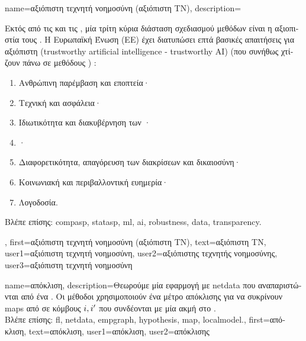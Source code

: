 {name={\foreignlanguage{greek}{αξιόπιστη τεχνητή νοημοσύνη (αξιόπιστη ΤΝ)}},
	description={\foreignlanguage{greek}{Εκτός από τις}  \foreignlanguage{greek}{και τις} , 
		\foreignlanguage{greek}{μία τρίτη κύρια διάσταση σχεδιασμού μεθόδων}  
		 \foreignlanguage{greek}{είναι η αξιοπιστία τους} 
		\cite{pfau2024engineeringtrustworthyaideveloper}. 
		\foreignlanguage{greek}{Η Ευρωπαϊκή Ένωση (ΕΕ) έχει διατυπώσει επτά βασικές απαιτήσεις για αξιόπιστη}  
		 (trustworthy artificial intelligence - trustworthy AI) \foreignlanguage{greek}{(που συνήθως χτίζουν πάνω σε 
		μεθόδους} ) \cite{ALTAIEU}: 
		\begin{enumerate}[label=\arabic*)]
			\item \foreignlanguage{greek}{Ανθρώπινη παρέμβαση και εποπτεία·}
			\item \foreignlanguage{greek}{Τεχνική}  \foreignlanguage{greek}{και ασφάλεια·}
			\item \foreignlanguage{greek}{Ιδιωτικότητα και διακυβέρνηση των} ·
			\item {}·
			\item \foreignlanguage{greek}{Διαφορετικότητα, απαγόρευση των διακρίσεων και δικαιοσύνη·}
			\item \foreignlanguage{greek}{Κοινωνιακή και περιβαλλοντική ευημερία·}
			\item \foreignlanguage{greek}{Λογοδοσία.}
		\end{enumerate}
		\foreignlanguage{greek}{Βλέπε επίσης:} \gls{compasp}, \gls{statasp}, \gls{ml}, \gls{ai}, \gls{robustness}, \gls{data}, \gls{transparency}.},
	first={\foreignlanguage{greek}{αξιόπιστη τεχνητή νοημοσύνη (αξιόπιστη ΤΝ)}},
	text={\foreignlanguage{greek}{αξιόπιστη ΤΝ}},
	user1={\foreignlanguage{greek}{αξιόπιστη τεχνητή νοημοσύνη}}, %
  	user2={\foreignlanguage{greek}{αξιόπιστης τεχνητής νοημοσύνης}}, %
	user3={\foreignlanguage{greek}{αξιόπιστη τεχνητή νοημοσύνη}} %
}

{name={\foreignlanguage{greek}{απόκλιση}},
	description={\foreignlanguage{greek}{Θεωρούμε μία εφαρμογή} 
		 \foreignlanguage{greek}{με} \gls{netdata} \foreignlanguage{greek}{που αναπαριστώνται από ένα}
		. \foreignlanguage{greek}{Οι μέθοδοι}  \foreignlanguage{greek}{χρησιμοποιούν 
		ένα μέτρο απόκλισης για να συκρίνουν} \gls{map}s  \foreignlanguage{greek}{από}  
		\foreignlanguage{greek}{σε κόμβους} $i,i'$ \foreignlanguage{greek}{που συνδέονται με μία ακμή στο} . \\
		\foreignlanguage{greek}{Βλέπε επίσης:} \gls{fl}, \gls{netdata}, \gls{empgraph}, \gls{hypothesis}, \gls{map}, \gls{localmodel}.},
	first={\foreignlanguage{greek}{απόκλιση}},
	text={\foreignlanguage{greek}{απόκλιση}},
	user1={\foreignlanguage{greek}{απόκλιση}}, %
	user2={\foreignlanguage{greek}{απόκλισης}} %
}

